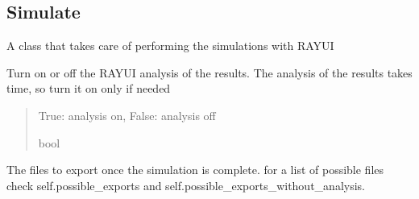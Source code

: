 \documentclass[letterpaper,10pt,english]{sphinxmanual}
\begin{document}
\subsection{Simulate}
\label{\detokenize{code_documentation:simulate}}

\begin{fulllineitems}
\label{\detokenize{code_documentation:raypyng.simulate.Simulate}}
\pysigstartsignatures
{}
\pysigstopsignatures
\sphinxAtStartPar
A class that takes care of performing the simulations with RAY\sphinxhyphen{}UI

\begin{fulllineitems}
\label{\detokenize{code_documentation:raypyng.simulate.Simulate.analyze}}
\pysigstartsignatures
{}
\pysigstopsignatures
\sphinxAtStartPar
Turn on or off the RAY\sphinxhyphen{}UI analysis of the results.
The analysis of the results takes time, so turn it on only if needed
\begin{quote}\begin{description}
\sphinxAtStartPar
True: analysis on, False: analysis off

\sphinxAtStartPar
bool

\end{description}\end{quote}

\end{fulllineitems}


\begin{fulllineitems}
\label{\detokenize{code_documentation:raypyng.simulate.Simulate.exports}}
\pysigstartsignatures
{}
\pysigstopsignatures
\sphinxAtStartPar
The files to export once the simulation is complete.
for a list of possible files check self.possible\_exports
and self.possible\_exports\_without\_analysis.


\end{fulllineitems}
\end{fulllineitems}
\end{document}
